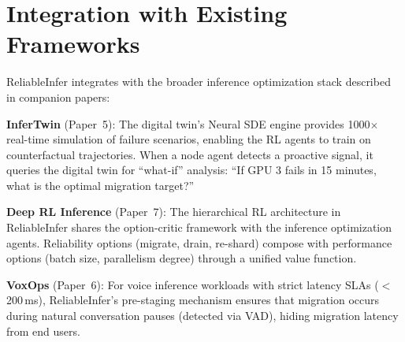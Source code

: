 \documentclass[conference,10pt,letterpaper]{IEEEtran}
\begin{document}
\begin{table}[!t]
\caption{Economic Impact of ReliableInfer (Annualized, 128 Nodes)}
\label{tab:economics}
\centering\scriptsize
{}
\end{table}

\section{Integration with Existing Frameworks}
\label{sec:integration}

ReliableInfer integrates with the broader inference optimization stack described in companion papers:

\textbf{InferTwin} (Paper~5): The digital twin's Neural SDE engine provides 1000$\times$ real-time simulation of failure scenarios, enabling the RL agents to train on counterfactual trajectories. When a node agent detects a proactive signal, it queries the digital twin for ``what-if'' analysis: ``If GPU 3 fails in 15 minutes, what is the optimal migration target?''

\textbf{Deep RL Inference} (Paper~7): The hierarchical RL architecture in ReliableInfer shares the option-critic framework with the inference optimization agents. Reliability options (migrate, drain, re-shard) compose with performance options (batch size, parallelism degree) through a unified value function.

\textbf{VoxOps} (Paper~6): For voice inference workloads with strict latency SLAs ($<$200\,ms), ReliableInfer's pre-staging mechanism ensures that migration occurs during natural conversation pauses (detected via VAD), hiding migration latency from end users.
\end{document}
